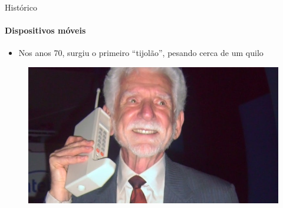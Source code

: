 \documentclass{beamer}
\begin{document}
\begin{frame}{Histórico}
	\framesubtitle{Dispositivos móveis}
	\begin{itemize}
		\item Nos anos 70, surgiu o primeiro ``tijolão'', pesando cerca de um quilo
		
	\end{itemize}
	\begin{figure}
		\includegraphics[width=0.6\paperwidth]{resources/tijolao}
	\end{figure}
\end{frame}
\end{document}
